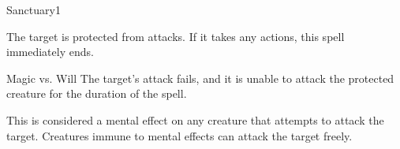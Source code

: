 \begin{spellsection}{Sanctuary}{1}
    \begin{spellheader}
    \end{spellheader}
    \begin{spellcontent}
        \begin{spelltargetinginfo}
        \end{spelltargetinginfo}
        \begin{spelleffects}
            \spelleffect The target is protected from attacks. If it takes any actions, this spell immediately ends.
            \spelldur \durshort
        \end{spelleffects}
    \end{spellcontent}
    \begin{spellsubcontent}
        \begin{spelltargetinginfo}
        \end{spelltargetinginfo}
        \begin{spelleffects}
            \begin{spellattack}{Magic vs. Will}
                \spellsuccess The target's attack fails, and it is unable to attack the protected creature for the duration of the spell.
            \end{spellattack}
        \end{spelleffects}
    \end{spellsubcontent}
    \begin{spellfooter}
        \spellnotes This is considered a mental effect on any creature that attempts to attack the target. Creatures immune to mental effects can attack the target freely.
        \miscastexplode
    \end{spellfooter}
\end{spellsection}

